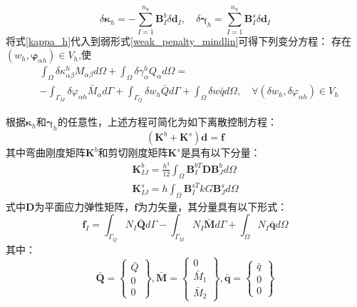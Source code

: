 \begin{equation}\label{kappa_h}
    \delta\boldsymbol\kappa_h = - \sum_{I=1}^{n_u} \boldsymbol B^b_I \delta\boldsymbol d_I ,\quad \delta\boldsymbol\gamma_h = \sum_{I=1}^{n_u} \boldsymbol B^s_I \delta\boldsymbol d_I
\end{equation}
将式\eqref{kappa_h}代入到弱形式\eqref{weak_penalty_mindlin}可得下列变分方程：
存在$(w_h,\boldsymbol{\varphi}_{\alpha h})\in V_h$,使
\begin{equation}\label{ritz_penalty_mindlin}
    \begin{split} 
        &\int_{\Omega}\delta\kappa^h_{\alpha\beta}M_{\alpha\beta}d\Omega+\int_{\Omega}\delta\gamma^h_{\alpha}Q_{\alpha}d\Omega=\\
        &-\int_{\Gamma_{M}}\delta\varphi_{\alpha h}{\bar{M}_{\alpha}}d\Gamma+\int_{\Gamma_{Q}}{\delta{w_h}}\bar {Q}d\Gamma+\int_{\Omega} \delta{w}\bar{q}d\Omega,\quad \forall(\delta w_h,\delta\varphi_{\alpha h}) \in V_h
    \end{split}
\end{equation}

根据$\pmb\kappa_h$和$\pmb\gamma_h$的任意性，上述方程可简化为如下离散控制方程：
\begin{equation}
    (\boldsymbol K^b + \boldsymbol K^s) \boldsymbol d = \boldsymbol f
\end{equation}
其中弯曲刚度矩阵$\boldsymbol K^b$和剪切刚度矩阵$\boldsymbol K^s$是具有以下分量：
\begin{subequations}\label{stiffness_mindlin}
    \begin{alignat}{2}
    \label{stiffness_bending}
    \boldsymbol K^b_{IJ} = \frac{h^3}{12} \int_\Omega \boldsymbol B^{bT}_I \boldsymbol D \boldsymbol B^b_J d\Omega\\
    \label{stiffness_shear}
    \boldsymbol K^s_{IJ} = h \int_\Omega \boldsymbol B^{sT}_I kG \boldsymbol B^s_J d\Omega
    \end{alignat}
\end{subequations}
式中$\pmb{D}$为平面应力弹性矩阵，$\pmb{f}$为力矢量，其分量具有以下形式：
\begin{equation}
    \boldsymbol f_I = \int_{\Gamma_Q} N_I \bar{\boldsymbol Q} d\Gamma - \int_{\Gamma_M} N_I \bar{\boldsymbol M} d\Gamma + \int_\Omega N_I \bar{\boldsymbol q} d\Omega
\end{equation}
其中：
\begin{equation}
    \bar{\boldsymbol Q} =  
    \begin{Bmatrix}
        \bar Q \\ 0 \\ 0
    \end{Bmatrix},
        \bar{\boldsymbol M} =
    \begin{Bmatrix}
        0 \\ \bar M_1 \\ \bar M_2
    \end{Bmatrix},
        \bar{\boldsymbol q} =
    \begin{Bmatrix}
        \bar q \\ 0 \\ 0
    \end{Bmatrix}
\end{equation}

